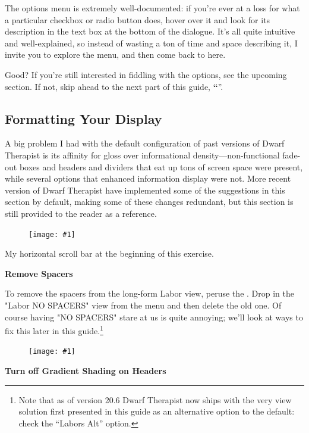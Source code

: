 \documentclass[]{article}
\newcommand{\jump}[1] {\textbf{``\nameref{sec:#1}}''}
\newcommand{\legacy}[1] {
\begin{center}
\colorbox{legacy-content}{
\begin{minipage}[t]{0.95\linewidth}
#1
\end{minipage}
}
\end{center}
}
\newcommand{\fullfigure}[1] {
\begin{figure}[h!]
\texttt{[image: \#1]}
\end{figure}
}
\newcommand{\fullfigurecaption}[1] {
\begin{center}
\vspace{-12pt}
#1
\end{center}
}
\begin{document}
The options menu is extremely well-documented: if you're ever at a loss for what a particular checkbox
or radio button does, hover over it and look for its description in the text box at the bottom of the
dialogue. It's all quite intuitive and well-explained, so instead of wasting a ton of time and space
describing it, I invite you to explore the menu, and then come back to here.

Good? If you're still interested in fiddling with the options, see the upcoming section. If not, skip
ahead to the next part of this guide, \jump{Advanced Features}.

\newpage
\subsection{Formatting Your Display}
\label{sec:Formatting Your Display}

\legacy{
A big problem I had with the default configuration of past versions of Dwarf Therapist is its affinity
for gloss over informational density---non-functional fade-out boxes and headers and dividers that eat
up tons of screen space were present, while several options that enhanced information display were not.
More recent version of Dwarf Therapist have implemented some of the suggestions in this section by
default, making some of these changes redundant, but this section is still provided to the reader as a
reference. }


\fullfigure{Sec2Fig18}
\fullfigurecaption{My horizontal scroll bar at the beginning of this exercise.}

\noindent \textbf{Remove Spacers}

To remove the spacers from the long-form Labor view, peruse the \textbf{}. Drop
in the "Labor NO SPACERS" view from the menu and then delete the old one. Of course having "NO SPACERS"
stare at us is quite annoying; we'll look at ways to fix this later in this guide.\footnote{Note that as
of version 20.6 Dwarf Therapist now ships with the very view solution first presented in this guide as
an alternative option to the default: check the ``Labors Alt'' option.}

\fullfigure{Sec2Fig19}

\noindent \textbf{Turn off Gradient Shading on Headers}
\end{document}
